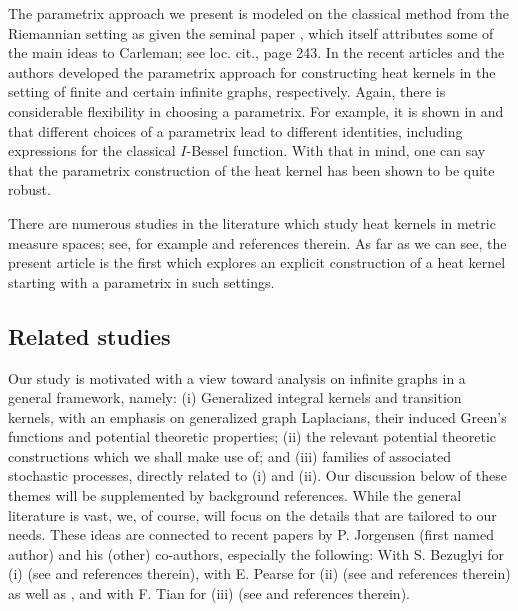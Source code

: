 \documentclass[11pt,reqno]{amsart}
\theoremstyle{remark}
\theoremstyle{definition}
\numberwithin{theorem}{section} \numberwithin{equation}{section}
\begin{document}
The parametrix approach we present is modeled on the classical method from the
Riemannian setting
as given the seminal paper \cite{MP49}, which itself attributes some of the main ideas to Carleman; see loc. cit., page 243.
In the recent articles \cite{CJKS24} and \cite{JKS26} the authors developed the parametrix approach for constructing heat kernels in
the setting of finite and certain infinite graphs, respectively.  Again, there is considerable flexibility in choosing a parametrix.
For example, it is shown in \cite{CJKS24} and \cite{JKS26} that different choices of a parametrix lead to different identities, including
expressions for the classical $I$-Bessel function.  With that in mind, one can say that the parametrix construction of the
heat kernel has been shown to be quite robust.

There are numerous studies in the literature which study heat kernels in metric measure spaces; see, for example \cite{Gr03} and
references therein.  As far as we can see, the present article is the first which explores an explicit construction of a heat
kernel starting with a parametrix in such settings.

\subsection{Related studies}
Our study is motivated with a view toward analysis on infinite graphs in a general framework, namely:
(i) Generalized integral kernels and transition kernels, with an emphasis on generalized graph Laplacians, their induced Green's functions and
potential theoretic properties;  (ii) the relevant potential theoretic constructions which we shall make use of; and (iii) families of associated
stochastic processes, directly related to (i) and (ii). Our discussion below of these themes will be supplemented by background references.
While the general literature is vast, we, of course, will focus on the details that are tailored to our needs.  These ideas are connected to recent papers
by P. Jorgensen (first named author) and his (other) co-authors, especially the following:
With S. Bezuglyi for (i) (see \cite{BJ23} and references therein), %
with E. Pearse for (ii) (see \cite{JP19} and references therein) as well as \cite{JRT25}, %
and with F. Tian for (iii) (see \cite{JT25} and references therein). %

\end{document}
